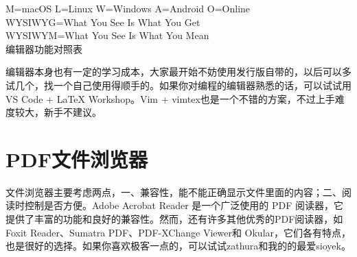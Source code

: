 \begin{table}[thpb]
	\centering

	M=macOS L=Linux W=Windows A=Android O=Online \\
	WYSIWYG=What You See Is What You Get         \\
	WYSIWYM=What You See Is What You Mean        \\
	\caption{编辑器功能对照表}
\end{table}

编辑器本身也有一定的学习成本，大家最开始不妨使用发行版自带的，以后可以多试几个，找一个自己使用得顺手的。如果你对编程的编辑器熟悉的话，可以试试用VS
Code + LaTeX Workshop。Vim + vimtex也是一个不错的方案，不过上手难度较大，新手不建议。

\section{PDF文件浏览器}
文件浏览器主要考虑两点，一、兼容性，能不能正确显示文件里面的内容；二、阅读时控制是否方便。Adobe Acrobat Reader
是一个广泛使用的 PDF 阅读器，它提供了丰富的功能和良好的兼容性。然而，还有许多其他优秀的PDF阅读器，如 Foxit
Reader、Sumatra PDF、PDF-XChange Viewer和
Okular，它们各有特点，也是很好的选择。如果你喜欢极客一点的，可以试试zathura和我的的最爱sioyek。

